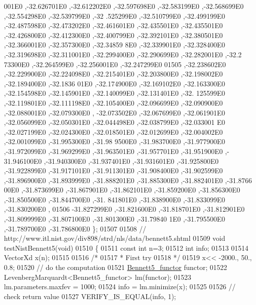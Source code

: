 \begin{DoxyCode}
      001E0 ,-32.626701E0 ,-32.612202E0 ,-32.597698E0 ,-32.583199E0 ,-32.568699E0 ,-32.554298E0 ,-32.539799E0 ,-32
      .525299E0 ,-32.510799E0 ,-32.499199E0 ,-32.487598E0 ,-32.473202E0 ,-32.461601E0 ,-32.435501E0 ,-32.435501E0 
      ,-32.426800E0 ,-32.412300E0 ,-32.400799E0 ,-32.392101E0 ,-32.380501E0 ,-32.366001E0 ,-32.357300E0 ,-32.34859
      8E0 ,-32.339901E0 ,-32.328400E0 ,-32.319698E0 ,-32.311001E0 ,-32.299400E0 ,-32.290699E0 ,-32.282001E0 ,-32.2
      73300E0 ,-32.264599E0 ,-32.256001E0 ,-32.247299E0
01505 ,-32.238602E0 ,-32.229900E0 ,-32.224098E0 ,-32.215401E0 ,-32.203800E0 ,-32.198002E0 ,-32.189400E0 ,-32.1836
      01E0 ,-32.174900E0 ,-32.169102E0 ,-32.163300E0 ,-32.154598E0 ,-32.145901E0 ,-32.140099E0 ,-32.131401E0 ,-32.
      125599E0 ,-32.119801E0 ,-32.111198E0 ,-32.105400E0 ,-32.096699E0 ,-32.090900E0 ,-32.088001E0 ,-32.079300E0 ,
      -32.073502E0 ,-32.067699E0 ,-32.061901E0 ,-32.056099E0 ,-32.050301E0 ,-32.044498E0 ,-32.038799E0 ,-32.033001
      E0 ,-32.027199E0 ,-32.024300E0 ,-32.018501E0 ,-32.012699E0 ,-32.004002E0 ,-32.001099E0 ,-31.995300E0 ,-31.98
      9500E0 ,-31.983700E0 ,-31.977900E0 ,-31.972099E0 ,-31.969299E0 ,-31.963501E0 ,-31.957701E0 ,-31.951900E0 ,-
      31.946100E0 ,-31.940300E0 ,-31.937401E0 ,-31.931601E0 ,-31.925800E0 ,-31.922899E0 ,-31.917101E0 ,-31.911301E0
       ,-31.908400E0 ,-31.902599E0 ,-31.896900E0 ,-31.893999E0 ,-31.888201E0 ,-31.885300E0 ,-31.882401E0 ,-31.8766
      00E0 ,-31.873699E0 ,-31.867901E0 ,-31.862101E0 ,-31.859200E0 ,-31.856300E0 ,-31.850500E0 ,-31.844700E0 ,-31.
      841801E0 ,-31.838900E0 ,-31.833099E0 ,-31.830200E0 ,
01506 -31.827299E0 ,-31.821600E0 ,-31.818701E0 ,-31.812901E0 ,-31.809999E0 ,-31.807100E0 ,-31.801300E0 ,-31.79840
      1E0 ,-31.795500E0 ,-31.789700E0 ,-31.786800E0 \};
01507 
01508 \textcolor{comment}{// http://www.itl.nist.gov/div898/strd/nls/data/bennett5.shtml}
01509 \textcolor{keywordtype}{void} testNistBennett5(\textcolor{keywordtype}{void})
01510 \{
01511   \textcolor{keyword}{const} \textcolor{keywordtype}{int}  n=3;
01512   \textcolor{keywordtype}{int} info;
01513 
01514   VectorXd x(n);
01515 
01516   \textcolor{comment}{/*}
01517 \textcolor{comment}{   * First try}
01518 \textcolor{comment}{   */}
01519   x<< -2000., 50., 0.8;
01520   \textcolor{comment}{// do the computation}
01521   \hyperlink{struct_bennett5__functor}{Bennett5\_functor} functor;
01522   LevenbergMarquardt<Bennett5\_functor> lm(functor);
01523   lm.parameters.maxfev = 1000;
01524   info = lm.minimize(x);
01525 
01526   \textcolor{comment}{// check return value}
01527   VERIFY\_IS\_EQUAL(info, 1);

\end{DoxyCode}
